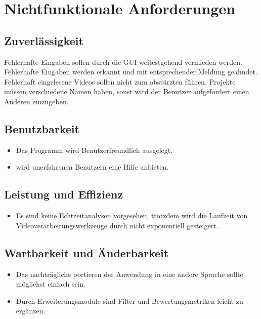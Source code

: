 \chapter{Nichtfunktionale Anforderungen}
\section{Zuverlässigkeit}
\setcounter{counterKriterien}{0}
 Fehlerhafte Eingaben sollen durch die GUI weitestgehend vermieden werden.
 Fehlerhafte Eingaben werden erkannt und mit entsprechender Meldung geahndet.
 Fehlerhaft eingelesene Videos sollen nicht zum abstürzten führen.
 Projekte müssen verschiedene Namen haben, sonst wird der Benutzer aufgefordert einen Anderen einzugeben.
\section{Benutzbarkeit}
\begin{itemize}
\item Das Programm wird Benutzerfreundlich ausgelegt.
\item \projektTitel wird unerfahrenen Benutzern eine Hilfe anbieten.
\end{itemize}
\section{Leistung und Effizienz}
\begin{itemize}
\item Es sind keine Echtzeitanalysen vorgesehen, trotzdem wird die Laufzeit von Videoverarbeitungswerkzeuge durch \projektTitel nicht exponentiell gesteigert.
\end{itemize}
\section{Wartbarkeit und Änderbarkeit}
\begin{itemize}
\item Das nachträgliche portieren der Anwendung in eine andere Sprache sollte möglichst einfach sein.
\item Durch Erweiterungsmodule sind Filter und Bewertungsmetriken leicht zu ergänzen.
\end{itemize}